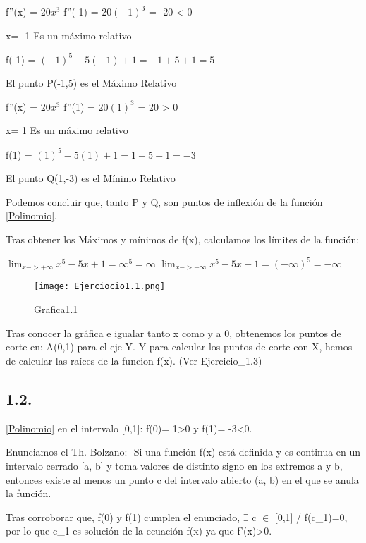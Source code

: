 \documentclass[12pt]{article}
\begin{document}
        f''(x) = $20x^3$
        f''(-1) = $20(-1)^3$ = -20 < 0

        x= -1 Es un máximo relativo

        f(-1) = $(-1)^5-5(-1)+1 = -1+5+1 = 5$

        El punto P(-1,5) es el Máximo Relativo

        f''(x) = $20x^3$
        f''(1) = $20(1)^3$ = 20 > 0

        x= 1 Es un máximo relativo

        f(1) = $(1)^5-5(1)+1 = 1-5+1 = -3$

        El punto Q(1,-3) es el Mínimo Relativo

        Podemos concluir que, tanto P y Q, son puntos de inflexión de la función \eqref{Polinomio}.

        Tras obtener los Máximos y mínimos de f(x), calculamos los límites de la función:

        $\lim_{x->+\infty} x^5-5x+1 = \infty^5 = \infty$
        $\lim_{x->-\infty} x^5-5x+1 = (-\infty)^5 = -\infty$

        \begin{figure}[ht]\label{f_x}
          \centering %
          \texttt{[image: Ejerciocio1.1.png]} %
          \caption[short]{Grafica1.1} %
        \end{figure}      
        
        Tras conocer la gráfica e igualar tanto x como y a 0, obtenemos los puntos de corte en:
        A(0,1) para el eje Y.
        Y para calcular los puntos de corte con X, hemos de calcular las raíces de la funcion f(x). (Ver Ejercicio_1.3)

      \subsection{1.2.}
        
      \eqref{Polinomio} en el intervalo [0,1]:
      f(0)= 1>0 y f(1)= -3<0.

      Enunciamos el Th. Bolzano:
      -Si una función f(x) está definida y es continua en un intervalo cerrado [a, b] y toma valores de distinto signo en los extremos a y b, entonces existe al menos un punto c del intervalo abierto (a, b) en el que se anula la función. 

      Tras corroborar que, f(0) y f(1) cumplen el enunciado, $\exists$ c $\in$ [0,1] / f(c_{1})=0, por lo que c_{1} es solución de la ecuación f(x) ya que f'(x)>0.
\end{document}
